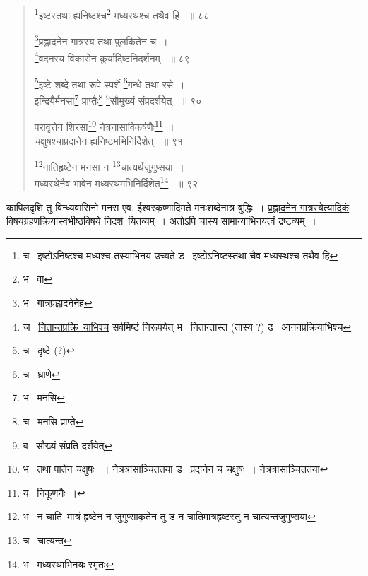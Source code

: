 \documentclass[11pt, openany]{book}
\begin{document}
{\newpage 

\begin{quote}
 {\na \renewcommand{\thefootnote}{1}\footnote{च \textendash\ इष्टोऽनिष्टश्च मध्यश्च तस्याभिनय उच्यते ड \textendash\ इष्टोऽनिष्टस्तथा चैव मध्यस्थश्च तथैव हि }इष्टस्तथा ह्यनिष्टश्च\renewcommand{\thefootnote}{2}\footnote{भ \textendash\ वा } मध्यस्थश्च तथैव हि ~॥ ८८ 

\renewcommand{\thefootnote}{3}\footnote{भ \textendash\ गात्रप्रह्लादनेनेह}प्रह्लादनेन गात्रस्य तथा पुलकितेन च~।\\ 
\renewcommand{\thefootnote}{4}\footnote{ज \textendash\ \underline{नितान्तप्रक्रि\textendash\ याभिश्च} सर्वमिष्टं निरूपयेत् भ \textendash\ नितान्तास्त (तास्य ?) ढ \textendash\ आननप्रक्रियाभिश्च }वदनस्य विकासेन कुर्यादिष्टनिदर्शनम् ~॥ ८९ 

\renewcommand{\thefootnote}{5}\footnote{च \textendash\ दृष्टे (?) }इष्टे शब्दे तथा रूपे स्पर्शे \renewcommand{\thefootnote}{6}\footnote{च \textendash\ घ्राणे}गन्धे तथा रसे~। \\
इन्द्रियैर्मनसा\renewcommand{\thefootnote}{7}\footnote{भ \textendash\ मनसि } प्राप्तैः\renewcommand{\thefootnote}{8}\footnote{च \textendash\ मनसि प्राप्ते} \renewcommand{\thefootnote}{9}\footnote{ब \textendash\ सौख्यं संप्रति दर्शयेत् }सौमुख्यं संप्रदर्शयेत् ~॥ ९० 

परावृत्तेन शिरसा\renewcommand{\thefootnote}{10}\footnote{भ \textendash\ तथा पातेन चक्षुषः ~। नेत्रत्रासाञ्चिततया ड \textendash\ प्रदानेन च चक्षुषः~। नेत्रत्रासाञ्चिततया} नेत्रनासाविकर्षणैः\renewcommand{\thefootnote}{11}\footnote{य \textendash\ निकूणनैः~। }~।\\
चक्षुषश्चाप्रदानेन ह्यनिष्टमभिनिर्दिशेत् ~॥ ९१ 

\renewcommand{\thefootnote}{12}\footnote{भ \textendash\ न चाति\textendash\ मात्रं हृष्टेन न जुगुप्साकृतेन तु ड न चातिमात्रहृष्टस्तु न चात्यन्तजुगुप्सया }नातिहृष्टेन मनसा न \renewcommand{\thefootnote}{13}\footnote{च \textendash\ चात्यन्त }चात्यर्थजुगुप्सया~।\\ 
मध्यस्थेनैव भावेन मध्यस्थमभिनिर्दिशेत्\renewcommand{\thefootnote}{14}\footnote{भ \textendash\ मध्यस्थाभिनयः स्मृतः } ~॥ ९२ }
\end{quote}

\begin{sloppypar}
\noindent
कापिलदृशि तु विन्ध्यवासिनो मनस एव, ईश्वरकृष्णादिमते मनःशब्देनात्र बुद्धिः~। \underline{प्रह्लादनेन गात्रस्येत्यादिकं} विषयग्रहणक्रियास्वभीष्ठविषये निदर्श\textendash\ यितव्यम्~। अतोऽपि चास्य सामान्याभिनयत्वं द्रष्टव्यम्~।\\ 
\end{sloppypar}

}
\end{document}
